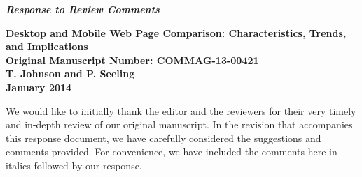 \documentclass[11pt, draftclsnofoot, onecolumn]{IEEEtran}
\begin{document}
\begin{center}
\begin{large}
\textit{\bf Response to Review Comments}
\end{large}
\end{center}

\begin{center}
\begin{large}
{\bf Desktop and Mobile Web Page Comparison: Characteristics, Trends, and Implications} \\
{\bf Original Manuscript Number: COMMAG-13-00421} \\


{\bf T. Johnson and P. Seeling} \\
{\bf January 2014}  \\

\end{large}
\end{center}

We would like to initially thank the editor and the reviewers for their very timely and in-depth review of our original manuscript.
In the revision that accompanies this response document, we have carefully considered the suggestions and comments provided.
For convenience, we have included the comments here in italics followed by our response.\\
\end{document}
